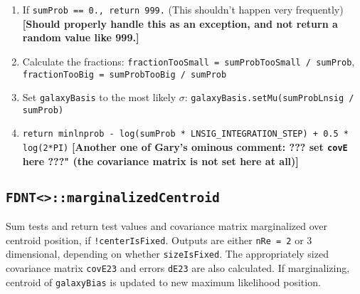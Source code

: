 \documentclass[useAMS,usenatbib,usegraphicx]{mn2e}
\begin{document}
\begin{enumerate}
\begin{itemize}
  \item Collect the proper sums: {\tt sumProb += prob}, {\tt sumProbLnsig += prob * lnsig},
    {\tt sumProbTooSmall += prob} if {\tt lnsig < lnSigmaFloor}, and 
    {\tt sumProbTooBig += prob} if {\tt lnsig > lnSigmaCeiling + TOO\_BIG}
  \end{itemize}
\item If {\tt sumProb == 0., return 999.}  (This shouldn't happen very frequently)
  {\bf [Should properly handle this as an exception, and not return a random value like 999.]}
\item Calculate the fractions: {\tt fractionTooSmall = sumProbTooSmall / sumProb},
  {\tt fractionTooBig = sumProbTooBig / sumProb}
\item Set {\tt galaxyBasis} to the most likely $\sigma$:  {\tt galaxyBasis.setMu(sumProbLnsig / sumProb)}
\item {\tt return minlnprob - log(sumProb * LNSIG\_INTEGRATION\_STEP) + 0.5 * log(2*PI)}
  {\bf [Another one of Gary's ominous comment: ??? set {\tt covE} here ???"  (the covariance
matrix is not set here at all)]}
\end{enumerate}

\subsection{\texttt{FDNT<>::marginalizedCentroid}}
Sum tests and return test values and covariance matrix marginalized over centroid position,
if {\tt !centerIsFixed}.  Outputs are either {\tt nRe = 2} or 3 dimensional, depending on
whether {\tt sizeIsFixed}.  The appropriately sized covariance matrix {\tt covE23} and errors
{\tt dE23} are also calculated.
If marginalizing, centroid of {\tt galaxyBias} is updated to new maximum likelihood position.
\end{document}

